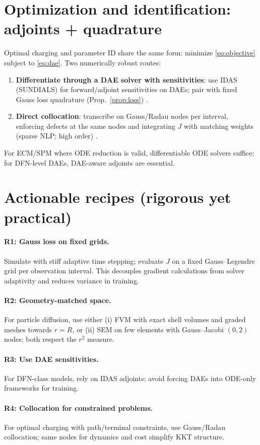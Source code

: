 \documentclass[11pt]{article}
\begin{document}
\section{Optimization and identification: adjoints + quadrature}
Optimal charging and parameter ID share the same form: minimize \eqref{eq:objective} subject to \eqref{eq:dae}. Two numerically robust routes:
\begin{enumerate}[label=(\alph*)]
\item \textbf{Differentiate through a DAE solver with sensitivities}: use IDAS (SUNDIALS) for forward/adjoint
sensitivities on DAEs; pair with fixed Gauss loss quadrature (Prop.~\ref{prop:loss}) \cite{sundialsidas,sundialsroot}.
\item \textbf{Direct collocation}: transcribe on Gauss/Radau nodes per interval, enforcing defects at the same nodes
and integrating $J$ with matching weights (sparse NLP; high order) \cite{hairerwanner}.
\end{enumerate}
For ECM/SPM where ODE reduction is valid, differentiable ODE solvers suffice; for DFN-level DAEs, DAE-aware adjoints are essential.

\section{Actionable recipes (rigorous yet practical)}
\paragraph{R1: Gauss loss on fixed grids.} Simulate with stiff adaptive time stepping; evaluate $J$ on a fixed Gauss--Legendre grid per observation interval. This decouples gradient calculations from solver adaptivity and reduces variance in training.
\paragraph{R2: Geometry-matched space.} For particle diffusion, use either (i) FVM with exact shell volumes and graded meshes towards $r=R$, or (ii) SEM on few elements with Gauss--Jacobi $(0,2)$ nodes; both respect the $r^2$ measure.
\paragraph{R3: Use DAE sensitivities.} For DFN-class models, rely on IDAS adjoints; avoid forcing DAEs into ODE-only frameworks for training.
\paragraph{R4: Collocation for constrained problems.} For optimal charging with path/terminal constraints, use Gauss/Radau collocation; same nodes for dynamics and cost simplify KKT structure.
\end{document}

